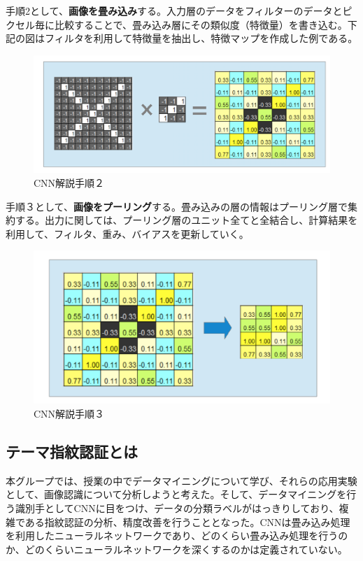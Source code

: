 \documentclass[a4paper, 11pt, titlepage]{jsarticle}
\begin{document}
手順2として、\textbf{画像を畳み込み}する。入力層のデータをフィルターのデータとピクセル毎に比較することで、畳み込み層にその類似度（特徴量）を書き込む。下記の図はフィルタを利用して特徴量を抽出し、特徴マップを作成した例である。

\begin{figure}[h]
  \centering
  \includegraphics[scale=0.3]{cnn2.png}
  \caption{CNN解説手順２}
  \label{cnn}
\end{figure}

手順３として、\textbf{画像をプーリング}する。畳み込みの層の情報はプーリング層で集約する。出力に関しては、プーリング層のユニット全てと全結合し、計算結果を利用して、フィルタ、重み、バイアスを更新していく。

\begin{figure}[h]
  \centering
  \includegraphics[scale=0.3]{cnn3.png}
  \caption{CNN解説手順３}
  \label{cnn}
\end{figure}


\subsection{テーマ指紋認証とは}
本グループでは、授業の中でデータマイニングについて学び、それらの応用実験として、画像認識について分析しようと考えた。そして、データマイニングを行う識別手としてCNNに目をつけ、データの分類ラベルがはっきりしており、複雑である指紋認証の分析、精度改善を行うこととなった。CNNは畳み込み処理を利用したニューラルネットワークであり、どのくらい畳み込み処理を行うのか、どのくらいニューラルネットワークを深くするのかは定義されていない。
\end{document}
